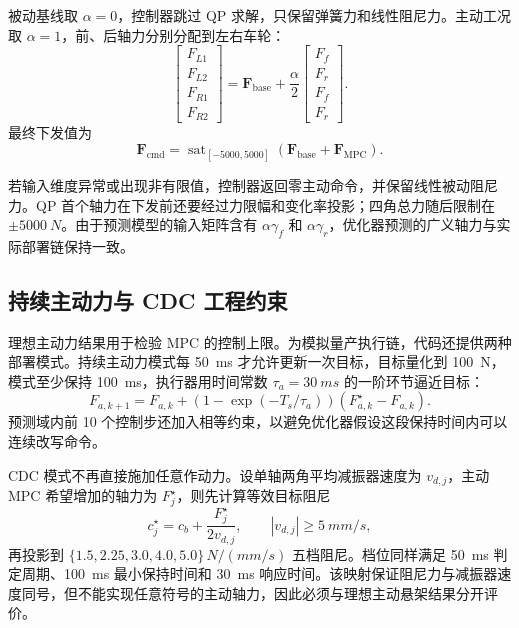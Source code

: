 \documentclass[UTF8,12pt,a4paper,fontset=windows]{ctexart}
\newcommand{\vect}[1]{\bm{#1}}
\newcommand{\sat}{\operatorname{sat}}
\begin{document}
被动基线取 $\alpha=0$，控制器跳过 QP 求解，只保留弹簧力和线性阻尼力。主动工况取 $\alpha=1$，前、后轴力分别分配到左右车轮：
\begin{equation}
\begin{bmatrix}
F_{L1}\\F_{L2}\\F_{R1}\\F_{R2}
\end{bmatrix}
=\vect{F}_{\text{base}}
+\frac{\alpha}{2}
\begin{bmatrix}
F_f\\F_r\\F_f\\F_r
\end{bmatrix}.
\end{equation}
最终下发值为
\begin{equation}
\vect{F}_{\text{cmd}}
=\sat_{[-5000,5000]}\!\left(\vect{F}_{\text{base}}+\vect{F}_{\text{MPC}}\right).
\end{equation}

若输入维度异常或出现非有限值，控制器返回零主动命令，并保留线性被动阻尼力。QP 首个轴力在下发前还要经过力限幅和变化率投影；四角总力随后限制在 $\pm\SI{5000}{N}$。由于预测模型的输入矩阵含有 $\alpha\gamma_f$ 和 $\alpha\gamma_r$，优化器预测的广义轴力与实际部署链保持一致。

\subsection{持续主动力与 CDC 工程约束}

理想主动力结果用于检验 MPC 的控制上限。为模拟量产执行链，代码还提供两种部署模式。持续主动力模式每 \SI{50}{ms} 才允许更新一次目标，目标量化到 \SI{100}{N}，模式至少保持 \SI{100}{ms}，执行器用时间常数 $\tau_a=\SI{30}{ms}$ 的一阶环节逼近目标：
\begin{equation}
F_{a,k+1}=F_{a,k}+\left(1-\exp(-T_s/\tau_a)\right)
\left(F_{a,k}^{\star}-F_{a,k}\right).
\end{equation}
预测域内前 10 个控制步还加入相等约束，以避免优化器假设这段保持时间内可以连续改写命令。

CDC 模式不再直接施加任意作动力。设单轴两角平均减振器速度为 $v_{d,j}$，主动 MPC 希望增加的轴力为 $F_j^{\star}$，则先计算等效目标阻尼
\begin{equation}
c_{j}^{\star}=c_b+\frac{F_j^{\star}}{2v_{d,j}},
\qquad |v_{d,j}|\geq \SI{5}{mm/s},
\end{equation}
再投影到 $\{1.5,2.25,3.0,4.0,5.0\}\,\si{N/(mm/s)}$ 五档阻尼。档位同样满足 \SI{50}{ms} 判定周期、\SI{100}{ms} 最小保持时间和 \SI{30}{ms} 响应时间。该映射保证阻尼力与减振器速度同号，但不能实现任意符号的主动轴力，因此必须与理想主动悬架结果分开评价。
\end{document}
